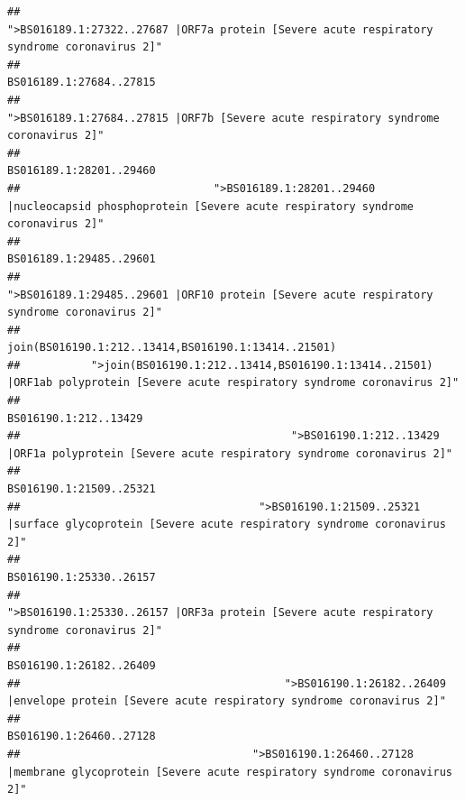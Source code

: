 \documentclass[
]{article}
\begin{document}
\begin{verbatim}
##                                            ">BS016189.1:27322..27687 |ORF7a protein [Severe acute respiratory syndrome coronavirus 2]" 
##                                                                                                                BS016189.1:27684..27815 
##                                                    ">BS016189.1:27684..27815 |ORF7b [Severe acute respiratory syndrome coronavirus 2]" 
##                                                                                                                BS016189.1:28201..29460 
##                              ">BS016189.1:28201..29460 |nucleocapsid phosphoprotein [Severe acute respiratory syndrome coronavirus 2]" 
##                                                                                                                BS016189.1:29485..29601 
##                                            ">BS016189.1:29485..29601 |ORF10 protein [Severe acute respiratory syndrome coronavirus 2]" 
##                                                                                    join(BS016190.1:212..13414,BS016190.1:13414..21501) 
##           ">join(BS016190.1:212..13414,BS016190.1:13414..21501) |ORF1ab polyprotein [Severe acute respiratory syndrome coronavirus 2]" 
##                                                                                                                  BS016190.1:212..13429 
##                                          ">BS016190.1:212..13429 |ORF1a polyprotein [Severe acute respiratory syndrome coronavirus 2]" 
##                                                                                                                BS016190.1:21509..25321 
##                                     ">BS016190.1:21509..25321 |surface glycoprotein [Severe acute respiratory syndrome coronavirus 2]" 
##                                                                                                                BS016190.1:25330..26157 
##                                            ">BS016190.1:25330..26157 |ORF3a protein [Severe acute respiratory syndrome coronavirus 2]" 
##                                                                                                                BS016190.1:26182..26409 
##                                         ">BS016190.1:26182..26409 |envelope protein [Severe acute respiratory syndrome coronavirus 2]" 
##                                                                                                                BS016190.1:26460..27128 
##                                    ">BS016190.1:26460..27128 |membrane glycoprotein [Severe acute respiratory syndrome coronavirus 2]" 

\end{verbatim}
\end{document}
